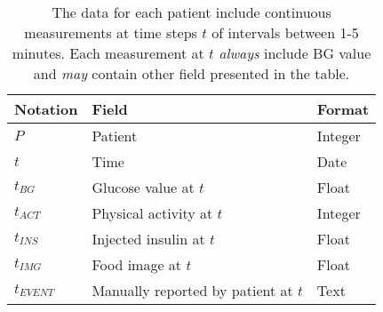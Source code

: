 \medskip
\begin{table}[ht!]
\begin{center}
  \begin{tabular}{lll}
  \textbf{Notation} &
  \textbf{Field} &
  \textbf{Format} \\
  \hline
  $P$ &
  Patient &
  Integer \\
  $t$ &
  Time &
  Date \\
  $t_{BG}$ &
  Glucose value at $t$ &
  Float \\
  $t_{ACT}$ &
  Physical activity at $t$ &
  Integer \\
  $t_{INS}$ &
  Injected insulin at $t$ &
  Float \\
  $t_{IMG}$ &
  Food image at $t$ &
  Float \\
  $t_{EVENT}$ &
  Manually reported by patient at $t$ &
  Text \\
  \hline
  \end{tabular}
  \caption[]
  {\small The data for each patient include continuous measurements at time steps $t$ of intervals between 1-5 minutes. Each measurement at $t$ \textit{always} include BG value and \textit{may} contain other field presented in the table.}
  \label{table:data_description}
\end{center}
\end{table}
